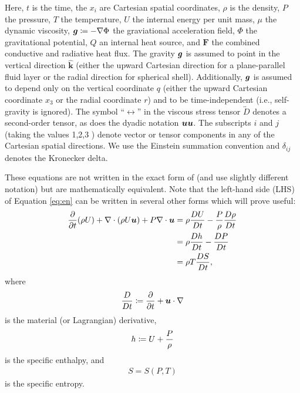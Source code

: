 \documentclass[12pt]{article}
\newcommand{\vecf}{\bm{F}}
\newcommand{\veck}{\hat{\bm{k}}}
\begin{document}
	Here, $t$ is the time, the $x_i$ are Cartesian spatial coordinates, $\rho$ is the density, $P$ the pressure, $T$ the temperature, $U$ the internal energy per unit mass, $\mu$ the dynamic viscosity, $\bm{g}\coloneqq -\nabla\Phi$ the graviational acceleration field, $\Phi$ the gravitational potential, $Q$ an internal heat source, and $\vecf$ the combined conductive and radiative heat flux. The gravity $\bm{g}$ is assumed to point in the vertical direction $\veck$ (either the upward Cartesian direction for a plane-parallel fluid layer or the radial direction for spherical shell). Additionally, $\bm{g}$ is assumed to depend only on the vertical coordinate $q$ (either the upward Cartesian coordinate $x_3$ or the radial coordinate $r$) and to be time-independent (i.e., self-gravity is ignored). The symbol ``$\leftrightarrow$'' in the viscous stress tensor $\overleftrightarrow{D}$ denotes a second-order tensor, as does the dyadic notation $\bm{u}\bm{u}$. The subscripts $i$ and $j$ (taking the values 1,2,3 ) denote vector or tensor components in any of the Cartesian spatial directions.  We use the Einstein summation convention and $\delta_{ij}$ denotes the Kronecker delta. 
	
	These equations are not written in the exact form of \citet{Gough1969} (and use slightly different notation) but are mathematically equivalent. Note that the left-hand side (LHS) of Equation \eqref{eq:en} can be written in several other forms which will prove useful: 
	\begin{subequations}\label{eq:enlhs}
	\begin{align}
		\frac{\partial}{\partial t}(\rho U) + \nabla\cdot(\rho U\bm{u}) + P\nabla\cdot\bm{u} &= \rho\frac{DU}{Dt} - \frac{P}{\rho}\frac{D\rho}{Dt}\\
		&= \rho\frac{Dh}{Dt} -\frac{DP}{Dt}\\
		&=\rho T \frac{DS}{Dt},
	\end{align}
	\end{subequations}
	where 
	\begin{align}\label{eq:matderiv}
		\frac{D}{Dt}{}\coloneqq \frac{\partial}{\partial t} + \bm{u}\cdot\nabla
	\end{align}
	is the material (or Lagrangian) derivative,
	\begin{align}\label{eq:enthalpy}
		h\coloneqq U + \frac{P}{\rho}
	\end{align}
	is the specific enthalpy, and
	\begin{align}\label{eq:entropy}
		S = S(P,T)
	\end{align}
	is the specific entropy. 
	
\end{document}
